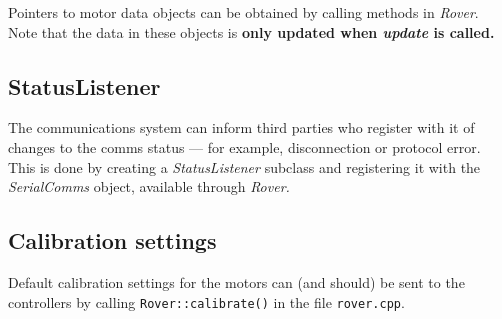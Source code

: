 Pointers to motor data objects can be obtained by calling methods in \emph{Rover}.
Note that the data in these objects is \textbf{only updated when \emph{update} is called.} 


\subsection{StatusListener}
The communications system can inform third parties who register with it of changes
to the comms status --- for example, disconnection or protocol error. This is done
by creating a \emph{StatusListener} subclass and registering it with the \emph{SerialComms} 
object, available through \emph{Rover.} 

\subsection{Calibration settings}
Default calibration settings for the motors can (and should) be sent
to the controllers by calling
\texttt{Rover::calibrate()} in the file \texttt{rover.cpp}.



